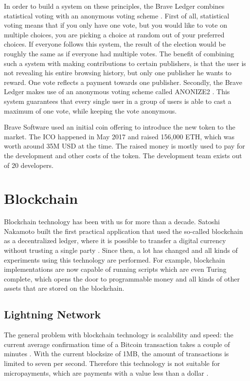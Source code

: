 In order to build a system on these principles, the Brave Ledger combines statistical voting with an anonymous voting scheme \cite{bat-ledger}. First of all, statistical voting means that if you only have one vote, but you would like to vote on multiple choices, you are picking a choice at random out of your preferred choices. If everyone follows this system, the result of the election would be roughly the same as if everyone had multiple votes. The benefit of combining such a system with making contributions to certain publishers, is that the user is not revealing his entire browsing history, but only one publisher he wants to reward. One vote reflects a payment towards one publisher. Secondly, the Brave Ledger makes use of an anonymous voting scheme called ANONIZE2 \cite{hohenberger2014anonize}. This system guarantees that every single user in a group of users is able to cast a maximum of one vote, while keeping the vote anonymous.

Brave Software used an initial coin offering to introduce the new token to the market. The ICO happened in May 2017 and raised 156,000 ETH, which was worth around 35M USD at the time. The raised money is mostly used to pay for the development and other costs of the token. The development team exists out of 20 developers.

\section{Blockchain}

Blockchain technology has been with us for more than a decade. Satoshi Nakamoto built the first practical application that used the so-called blockchain as a decentralized ledger, where it is possible to transfer a digital currency without trusting a single party \cite{nakamoto2019bitcoin}. Since then, a lot has changed and all kinds of experiments using this technology are performed. For example, blockchain implementations are now capable of running scripts which are even Turing complete, which opens the door to programmable money \cite{wood2014ethereum} and all kinds of other assets that are stored on the blockchain.

\subsection{Lightning Network}
The general problem with blockchain technology is scalability and speed: the current average confirmation time of a Bitcoin transaction takes a couple of minutes \cite{bamert2013have}. With the current blocksize of 1MB, the amount of transactions is limited to seven per second. Therefore this technology is not suitable for micropayments, which are payments with a value less than a dollar \cite{definitionmicropayment}.

